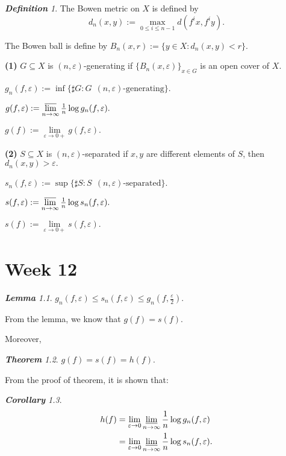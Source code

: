 \documentclass[10pt, a4paper, oneside]{report}
\numberwithin{equation}{chapter}
\theoremstyle{remark}
\newtheorem{definition}{\bf{Definition}}[chapter]
\newtheorem{theorem}[definition]{\bf{Theorem}}
\newtheorem{lemma}[definition]{\bf{Lemma}}
\newtheorem{corollary}[definition]{\bf{Corollary}}
\theoremstyle{remark}
\begin{document}
\begin{definition}
    The Bowen metric on $X$ is defined by $$d_n(x,y):=\max\limits_{0\leqslant i\leqslant n-1}d(f^ix,f^iy).$$

    The Bowen ball is define by $B_n(x,r):=\{y\in X:d_n(x,y)<r\}.$

    {\bf (1)} $G\subseteq X$ is $(n,\varepsilon)$-generating if $\{B_n(x,\varepsilon)\}_{x\in G}$ is an open cover of $X$.

    $g_n(f,\varepsilon):=\inf\{\sharp G:G ~~(n,\varepsilon)\text{-generating}\}$.

    $g(f,\varepsilon):=\varlimsup\limits_{n\to\infty}\frac{1}{n}\log g_n(f,\varepsilon).$

    $g(f):=\lim\limits_{\varepsilon\to 0+}g(f,\varepsilon).$

    {\bf (2)} $S\subseteq X$ is $(n,\varepsilon)$-separated if $x,y$ are different elements of $S$, then $d_n(x,y)>\varepsilon.$

    $s_n(f,\varepsilon):=\sup\{\sharp S:S ~~(n,\varepsilon)\text{-separated}\}$.

    $s(f,\varepsilon):=\varlimsup\limits_{n\to\infty}\frac{1}{n}\log s_n(f,\varepsilon).$

    $s(f):=\lim\limits_{\varepsilon\to 0+}s(f,\varepsilon).$
\end{definition}
    
\chapter{Week 12}

\begin{lemma}
    $g_n(f,\varepsilon)\leqslant s_n(f,\varepsilon)\leqslant g_n(f,\frac{\varepsilon}{2}).$
\end{lemma}

From the lemma, we know that $g(f)=s(f)$.

Moreover,

\begin{theorem}
    $g(f)=s(f)=h(f).$
\end{theorem}

From the proof of theorem, it is shown that:

\begin{corollary}
    \begin{equation*}
        \begin{aligned}
            h(f)&=\lim\limits_{\varepsilon\to 0}\varliminf\limits_{n\to\infty}\frac{1}{n}\log g_n(f,\varepsilon)\\
            &=\lim\limits_{\varepsilon\to 0}\varliminf\limits_{n\to\infty}\frac{1}{n}\log s_n(f,\varepsilon).
        \end{aligned}
    \end{equation*}
\end{corollary}
\end{document}
